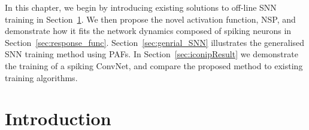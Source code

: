 In this chapter, we begin by introducing existing solutions to off-line SNN training in Section~\ref{sec:intro_NSP}.
We then propose the novel activation function, NSP, and demonstrate how it fits the network dynamics composed of spiking neurons in Section~\ref{sec:response_func}.
Section~\ref{sec:genrial_SNN} illustrates the generalised SNN training method using PAFs.
In Section~\ref{sec:iconipResult} we demonstrate the training of a spiking ConvNet, and compare the proposed method to existing training algorithms.

\section{Introduction}
\label{sec:intro_NSP}

%
%

